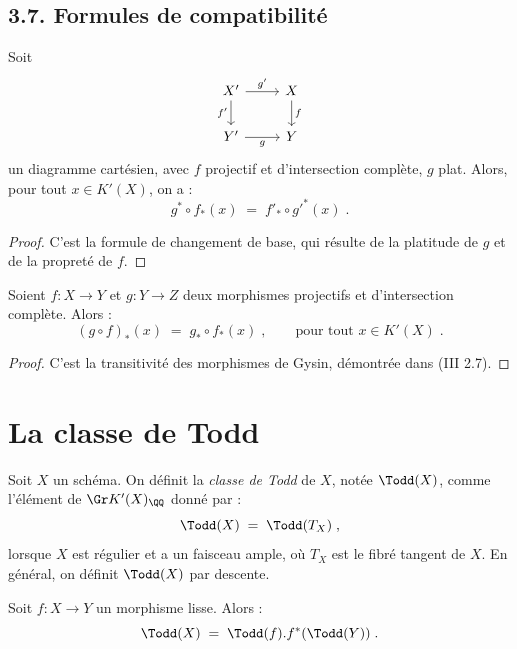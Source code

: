 \subsection*{3.7. Formules de compatibilité}

\begin{proposition}[3.7]%
Soit
\[
\begin{tikzcd}
X' \arrow[r, "g'"] \arrow[d, "f'"'] & X \arrow[d, "f"] \\
Y' \arrow[r, "g"'] & Y
\end{tikzcd}
\]
un diagramme cartésien, avec $f$ projectif et d'intersection complète, $g$ plat. Alors, pour tout $x \in K'(X)$, on a :
\[
g^* \circ f_*(x) \; = \; f'_* \circ g'^*(x)\; .
\]
\end{proposition}

\begin{proof}
C'est la formule de changement de base, qui résulte de la platitude de $g$ et de la propreté de $f$.
\end{proof}

\begin{proposition}[3.8]%
Soient $f : X \to Y$ et $g : Y \to Z$ deux morphismes projectifs et d'intersection complète. Alors :
\[
(g \circ f)_*(x) \; = \; g_* \circ f_*(x)\; , \qquad \text{pour tout } x \in K'(X)\; .
\]
\end{proposition}

\begin{proof}
C'est la transitivité des morphismes de Gysin, démontrée dans (III 2.7).
\end{proof}


\section{La classe de Todd}

\begin{definition}[4.1]%
Soit $X$ un schéma. On définit la \emph{classe de Todd} de $X$, notée $\Todd(X)$, comme l'élément de $\Gr K'(X)_{\QQ}$ donné par :
\[
\Todd(X) \; = \; \Todd(T_X)\; ,
\]
lorsque $X$ est régulier et a un faisceau ample, où $T_X$ est le fibré tangent de $X$. En général, on définit $\Todd(X)$ par descente.
\end{definition}

\begin{proposition}[4.2]%
Soit $f : X \to Y$ un morphisme lisse. Alors :
\[
\Todd(X) \; = \; \Todd(f) . f^*(\Todd(Y))\; .
\]
\end{proposition}

